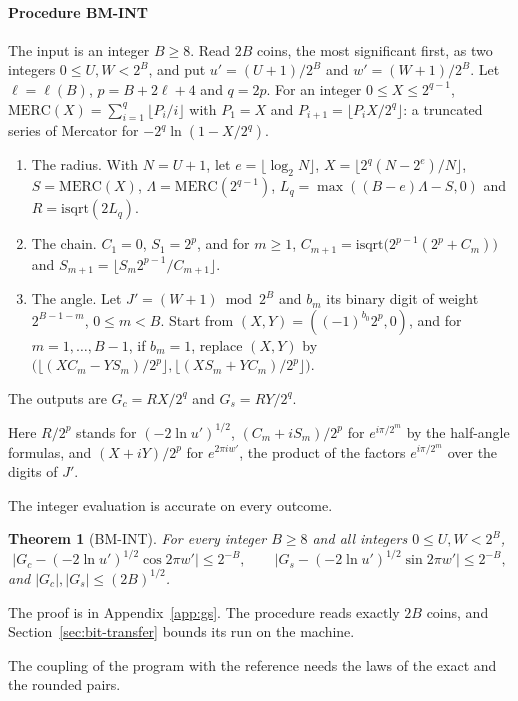 \documentclass[11pt]{amsart}
\newtheorem{theorem}{Theorem}[section]
\theoremstyle{definition}
\numberwithin{equation}{section}
\begin{document}
\paragraph{Procedure BM-INT} The input is an integer $B\ge8$. Read $2B$ coins, the most significant first, as two integers $0\le U,W<2^B$, and put $u'=(U+1)/2^B$ and $w'=(W+1)/2^B$. Let $\ell=\ell(B)$, $p=B+2\ell+4$ and $q=2p$. For an integer $0\le X\le2^{q-1}$, $\mathrm{MERC}(X)=\sum_{i=1}^q\lfloor P_i/i\rfloor$ with $P_1=X$ and $P_{i+1}=\lfloor P_iX/2^q\rfloor$: a truncated series of Mercator for $-2^q\ln(1-X/2^q)$.
\begin{enumerate}[label=\arabic*.,leftmargin=2em]
\item The radius. With $N=U+1$, let $e=\lfloor\log_2N\rfloor$, $X=\lfloor2^q(N-2^e)/N\rfloor$, $S=\mathrm{MERC}(X)$, $\Lambda=\mathrm{MERC}(2^{q-1})$, $L_q=\max((B-e)\Lambda-S,0)$ and $R=\mathrm{isqrt}(2L_q)$.
\item The chain. $C_1=0$, $S_1=2^p$, and for $m\ge1$, $C_{m+1}=\mathrm{isqrt}\bigl(2^{p-1}(2^p+C_m)\bigr)$ and $S_{m+1}=\lfloor S_m2^{p-1}/C_{m+1}\rfloor$.
\item The angle. Let $J'=(W+1)\bmod2^B$ and $b_m$ its binary digit of weight $2^{B-1-m}$, $0\le m<B$. Start from $(X,Y)=((-1)^{b_0}2^p,0)$, and for $m=1,\dots,B-1$, if $b_m=1$, replace $(X,Y)$ by $\bigl(\lfloor(XC_m-YS_m)/2^p\rfloor,\lfloor(XS_m+YC_m)/2^p\rfloor\bigr)$.
\end{enumerate}
The outputs are $G_c=RX/2^q$ and $G_s=RY/2^q$.

Here $R/2^p$ stands for $(-2\ln u')^{1/2}$, $(C_m+iS_m)/2^p$ for $e^{i\pi/2^m}$ by the half-angle formulas, and $(X+iY)/2^p$ for $e^{2\pi iw'}$, the product of the factors $e^{i\pi/2^m}$ over the digits of $J'$.

The integer evaluation is accurate on every outcome.

\begin{theorem}[BM-INT]\label{thm:gsm}
For every integer $B\ge8$ and all integers $0\le U,W<2^B$,
\[
\bigl|G_c-(-2\ln u')^{1/2}\cos2\pi w'\bigr|\le2^{-B},\qquad\bigl|G_s-(-2\ln u')^{1/2}\sin2\pi w'\bigr|\le2^{-B},
\]
and $|G_c|,|G_s|\le(2B)^{1/2}$.
\end{theorem}

The proof is in Appendix~\ref{app:gs}. The procedure reads exactly $2B$ coins, and Section~\ref{sec:bit-transfer} bounds its run on the machine.

The coupling of the program with the reference needs the laws of the exact and the rounded pairs.
\end{document}
